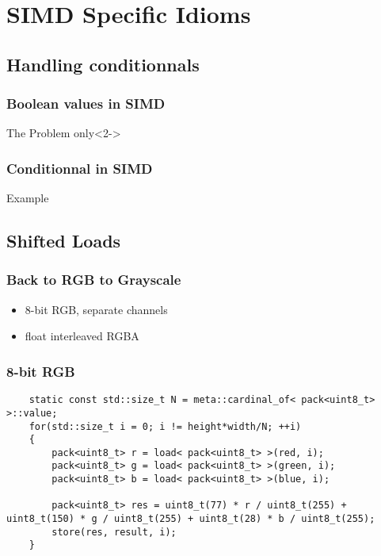 \section{SIMD Specific Idioms}
\subsection{Handling conditionnals}
\frame 
{
  \frametitle{Boolean values in SIMD}
  \begin{block}{The Problem}
  \lstsimdbool
  only<2->{ \lstsimdboolresult }
 \end{block}{}

}

\frame 
{
  \frametitle{Conditionnal in SIMD}
  \begin{block}{Example}
 \end{block}{}
}

\subsection{Shifted Loads}
\frame {}

\begin{frame}
	\frametitle{Back to RGB to Grayscale}
	
	\begin{itemize}
		\item 8-bit RGB, separate channels
		\item float interleaved RGBA
	\end{itemize}
	
\end{frame}

\begin{frame}[fragile]
	\frametitle{8-bit RGB}
	
	\begin{lstlisting}
	static const std::size_t N = meta::cardinal_of< pack<uint8_t> >::value;
	for(std::size_t i = 0; i != height*width/N; ++i)
	{
	    pack<uint8_t> r = load< pack<uint8_t> >(red, i);
	    pack<uint8_t> g = load< pack<uint8_t> >(green, i);
	    pack<uint8_t> b = load< pack<uint8_t> >(blue, i);
		
	    pack<uint8_t> res = uint8_t(77) * r / uint8_t(255) + uint8_t(150) * g / uint8_t(255) + uint8_t(28) * b / uint8_t(255);
	    store(res, result, i);
	}
	\end{lstlisting}
\end{frame}

